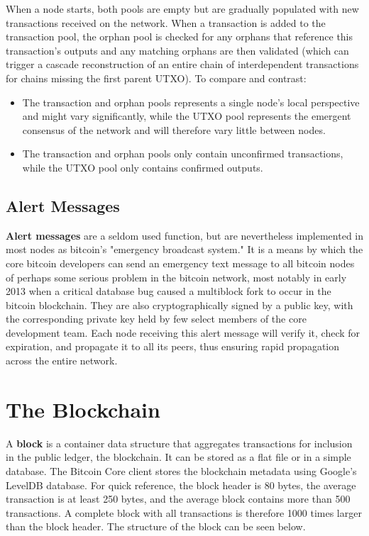 \documentclass{article}
\begin{document}
    When a node starts, both pools are empty but are gradually populated with new transactions received on the network. When a transaction is added to the transaction pool, the orphan pool is checked for any orphans that reference this transaction's outputs and any matching orphans are then validated (which can trigger a cascade reconstruction of an entire chain of interdependent transactions for chains missing the first parent UTXO). To compare and contrast:

    \begin{itemize}
      \item The transaction and orphan pools represents a single node's local perspective and might vary significantly, while the UTXO pool represents the emergent consensus of the network and will therefore vary little between nodes.
      \item The transaction and orphan pools only contain unconfirmed transactions, while the UTXO pool only contains confirmed outputs.
    \end{itemize}

  \subsection{Alert Messages}

    \textbf{Alert messages} are a seldom used function, but are nevertheless implemented in most nodes as bitcoin's "emergency broadcast system." It is a means by which the core bitcoin developers can send an emergency text message to all bitcoin nodes of perhaps some serious problem in the bitcoin network, most notably in early 2013 when a critical database bug caused a multiblock fork to occur in the bitcoin blockchain. They are also cryptographically signed by a public key, with the corresponding private key held by few select members of the core development team. Each node receiving this alert message will verify it, check for expiration, and propagate it to all its peers, thus ensuring rapid propagation across the entire network.

\section{The Blockchain}

    A \textbf{block} is a container data structure that aggregates transactions for inclusion in the public ledger, the blockchain. It can be stored as a flat file or in a simple database. The Bitcoin Core client stores the blockchain metadata using Google's LevelDB database. For quick reference, the block header is 80 bytes, the average transaction is at least 250 bytes, and the average block contains more than 500 transactions. A complete block with all transactions is therefore 1000 times larger than the block header. The structure of the block can be seen below.
\end{document}
